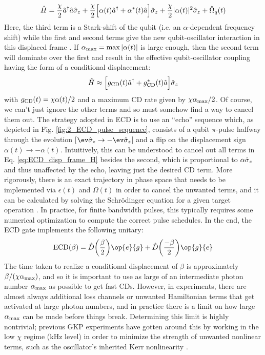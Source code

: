 \begin{equation}
    \hat{H} = \frac{\chi}{2}\hat{a}^\dagger\hat{a}\hat{\sigma}_z + \frac{\chi}{2}\Big[\alpha(t)\hat{a}^\dagger + \alpha^\ast(t)\hat{a}\Big]\hat{\sigma}_z + \frac{\chi}{2}|\alpha(t)|^2\hat{\sigma}_z +  \hat{\Omega}_q(t)
    \label{eq:ECD_disp_frame_H}
\end{equation}
Here, the third term is a Stark-shift of the qubit (i.e. an $\alpha$-dependent frequency shift) while the first and second terms give the new qubit-oscillator interaction in this displaced frame \cite{murch2012cavity, eddins2018stroboscopic}. If $\alpha_{\rm max} = \max|\alpha(t)|$ is large enough, then the second term will dominate over the first and result in the effective qubit-oscillator coupling having the form of a conditional displacement: 
\begin{equation}
    \hat{H} \approx \Big[g_{\rm CD}(t)\hat{a}^\dagger + g_{\rm CD}^\ast(t)\hat{a}\Big]\hat{\sigma}_z
\end{equation}
with $g_{\rm CD}(t) = \chi\alpha(t)/2$ and a maximum CD rate given by $\chi\alpha_{\rm max}/2$. Of course, we can't just ignore the other terms and so must somehow find a way to cancel them out. The strategy adopted in ECD is to use an ``echo'' sequence which, as depicted in Fig. \ref{fig:2_ECD_pulse_sequence}, consists of a qubit $\pi$-pulse halfway through the evolution [$\ev\sigmaz \to -\ev\sigmaz$] and a flip on the displacement sign $\alpha(t) \to -\alpha(t)$. Intuitively, this can be understood to cancel out all terms in Eq. \eqref{eq:ECD_disp_frame_H} besides the second, which is proportional to $\alpha\hat{\sigma}_z$ and thus unaffected by the echo, leaving just the desired CD term. More rigorously, there is an exact trajectory in phase space that needs to be implemented via $\epsilon(t)$ and $\Omega(t)$ in order to cancel the unwanted terms, and it can be calculated by solving the Schr\"odinger equation for a given target operation \cite{eickbusch2022fast}. In practice, for finite bandwidth pulses, this typically requires some numerical optimization to compute the correct pulse schedules. In the end, the ECD gate implements the following unitary:
\begin{equation}
    {\rm ECD}(\beta) = \hat{D}\bigg(\frac{\beta}{2}\bigg)\op{e}{g} + \hat{D}\bigg(\frac{-\beta}{2}\bigg)\op{g}{e}
\end{equation}
The time taken to realize a conditional displacement of $\beta$ is approximately $\beta / (\chi\alpha_{\rm max})$, and so it is important to use as large of an intermediate photon number $\alpha_{\rm max}$ as possible to get fast CDs. However, in experiments, there are almost always additional loss channels or unwanted Hamiltonian terms that get activated at large photon numbers, and in practice there is a limit on how large $\alpha_{\rm max}$ can be made before things break. Determining this limit is highly nontrivial; previous GKP experiments have gotten around this by working in the low $\chi$ regime (kHz level) in order to minimize the strength of unwanted nonlinear terms, such as the oscillator's inherited Kerr nonlinearity \cite{campagne2020gkp-expt, eickbusch2022fast, sivak2023gkp-expt, nordquantique2023gkp-expt}. 

